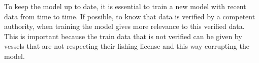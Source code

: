To keep the model up to date, it is essential to train a new model with recent data from time to time. If possible, to know that data is verified by a competent authority, when training the model gives more relevance to this verified data. This is important because the train data that is not verified can be given by vessels that are not respecting their fishing license and this way corrupting the model.








